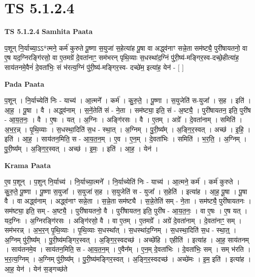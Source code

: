 \documentclass[17pt]{extarticle}
\begin{document}
\section{ TS 5.1.2.4 }

\textbf{TS 5.1.2.4 } \newline
\textbf{Samhita Paata} \newline

प॒शून् नि॒र्याच्या॒ऽऽ*त्मने॒ कर्म॑ कुरुते पू॒ष्णा स॒युजा॑ स॒हेत्या॑ह पू॒षा वा अद्ध्व॑नाꣳ सन्ने॒ता सम॑ष्ट्यै॒ पुरी॑षायतनो॒ वा ए॒ष यद॒ग्निरङ्गि॑रसो॒ वा ए॒तमग्रे॑ दे॒वता॑नाꣳ॒॒ सम॑भरन् पृथि॒व्याः स॒धस्था॑द॒ग्निं पु॑री॒ष्य॑-मङ्गिर॒स्व-दच्छे॒हीत्या॑ह॒ साय॑तनमे॒वैनं॑ दे॒वता॑भिः॒ सं भ॑रत्य॒ग्निं पु॑री॒ष्य॑-मङ्गिर॒स्व- दच्छे॑म॒ इत्या॑ह॒ येन॑ - [  ] \newline

\textbf{Pada Paata} \newline

प॒शून् । नि॒र्याच्येति॑ निः - याच्य॑ । आ॒त्मने᳚ । कर्म॑ । कु॒रु॒ते॒ । पू॒ष्णा । स॒युजेति॑ स-युजा᳚ । स॒ह । इति॑ । आ॒ह॒ । पू॒षा । वै । अद्ध्व॑नाम् । स॒नें॒तेति॑ सं - ने॒ता । सम॑ष्ट्या॒ इति॒ सं - अ॒ष्ट्यै॒ । पुरी॑षायतन॒ इति॒ पुरी॑ष - आ॒य॒त॒नः॒ । वै । ए॒षः । यत् । अ॒ग्निः । अङ्गि॑रसः । वै । ए॒तम् । अग्रे᳚ । दे॒वता॑नाम् । समिति॑ । अ॒भ॒र॒न्न् । पृ॒थि॒व्याः । स॒धस्था॒दिति॑ स॒ध - स्था॒त् । अ॒ग्निम् । पु॒री॒ष्य᳚म् । अ॒ङ्गि॒र॒स्वत् । अच्छ॑ । इ॒हि॒ । इति॑ । आ॒ह॒ । साय॑तन॒मिति॒ स - आ॒य॒त॒न॒म् । ए॒व । ए॒न॒म् । दे॒वता॑भिः । समिति॑ । भ॒र॒ति॒ । अ॒ग्निम् । पु॒री॒ष्य᳚म् । अ॒ङ्गि॒र॒स्वत् । अच्छ॑ । इ॒मः॒ । इति॑ । आ॒ह॒ । येन॑ ।  \newline


\textbf{Krama Paata} \newline

ए॒व प॒शून् । प॒शुन् नि॒र्याच्य॑ । नि॒र्याच्या॒त्मने᳚ । नि॒र्याच्येति॑ निः - याच्य॑ । आ॒त्मने॒ कर्म॑ । कर्म॑ कुरुते । कु॒रु॒ते॒ पू॒ष्णा । पू॒ष्णा स॒युजा᳚ । स॒युजा॑ स॒ह । स॒युजेति॑ स - युजा᳚ । स॒हेति॑ । इत्या॑ह । आ॒ह॒ पू॒षा । पू॒षा वै । वा अद्ध्व॑नाम् । अद्ध्व॑नाꣳ सन्ने॒ता । स॒न्ने॒ता सम॑ष्ट्यै । स॒न्ने॒तेति॑ सम् - ने॒ता । सम॑ष्ट्यै॒ पुरी॑षायतनः । सम॑ष्ट्या॒ इति॒ सम् - अ॒ष्ट्यै॒ । पुरी॑षायतनो॒ वै । पुरी॑षायतन॒ इति॒ पुरी॑ष - आ॒य॒त॒नः॒ । वा ए॒षः । ए॒ष यत् । यद॒ग्निः । अ॒ग्निरङ्गि॑रसः । अङ्गि॑रसो॒ वै । वा ए॒तम् । ए॒तमग्रे᳚ । अग्रे॑ दे॒वता॑नाम् । दे॒वता॑नाꣳ॒॒ सम् । सम॑भरन्न् । अ॒भ॒र॒न् पृ॒थि॒व्याः । पृ॒थि॒व्याः स॒धस्था᳚त् । स॒धस्था॑द॒ग्निम् । स॒धस्था॒दिति॑ स॒ध - स्था॒त्॒ । अ॒ग्निम् पु॑री॒ष्य᳚म् । पु॒री॒ष्य॑मङ्गिर॒स्वत् । अ॒ङ्गि॒र॒स्वदच्छ॑ । अच्छे॑हि । एहीति॑ । इत्या॑ह । आ॒ह॒ साय॑तनम् । साय॑तनमे॒व । साय॑तन॒मिति॒ स - आ॒य॒त॒न॒म् । ए॒वैन᳚म् । ए॒न॒म् दे॒वता॑भिः । दे॒वता॑भिः॒ सम् । सम् भ॑रति । भ॒र॒त्य॒ग्निम् । अ॒ग्निम् पु॑री॒ष्य᳚म् । पु॒री॒ष्य॑मङ्गिर॒स्वत् । अ॒ङ्गि॒र॒स्वदच्छ॑ । अच्छे॑मः । इ॒म॒ इति॑ । इत्या॑ह । आ॒ह॒ येन॑ । येन॑ स॒ङ्गच्छ॑ते \newline
\end{document}
